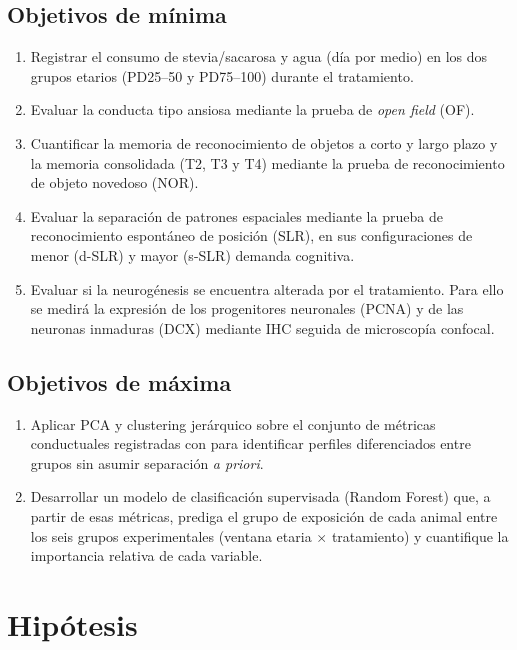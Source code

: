 \subsection{Objetivos de mínima}\label{sec:obj-minima}

\begin{enumerate}[label=\arabic*.,itemsep=0pt,topsep=2pt]
  \item Registrar el consumo de stevia/sacarosa y agua (día por medio) en los dos grupos etarios (PD25--50 y PD75--100) durante el tratamiento.
  \item Evaluar la conducta tipo ansiosa mediante la prueba de \textit{open field} (OF).
  \item Cuantificar la memoria de reconocimiento de objetos a corto y largo plazo y la memoria consolidada (T2, T3 y T4) mediante la prueba de reconocimiento de objeto novedoso (NOR).
  \item Evaluar la separación de patrones espaciales mediante la prueba de reconocimiento espontáneo de posición (SLR), en sus configuraciones de menor (d-SLR) y mayor (s-SLR) demanda cognitiva.
  \item Evaluar si la neurogénesis se encuentra alterada por el tratamiento. Para ello se medirá la expresión de los progenitores neuronales (PCNA) y de las neuronas inmaduras (DCX) mediante IHC seguida de microscopía confocal.
\end{enumerate}

\subsection{Objetivos de máxima}\label{sec:obj-maxima}

\begin{enumerate}[label=\arabic*.,itemsep=0pt,topsep=2pt]
  \item Aplicar PCA y clustering jerárquico sobre el conjunto de métricas conductuales registradas con \anymaze{} para identificar perfiles diferenciados entre grupos sin asumir separación \textit{a priori}.
  \item Desarrollar un modelo de clasificación supervisada (Random Forest) que, a partir de esas métricas, prediga el grupo de exposición de cada animal entre los seis grupos experimentales (ventana etaria $\times$ tratamiento) y cuantifique la importancia relativa de cada variable.
\end{enumerate}

\section{Hipótesis}\label{sec:hipotesis}

